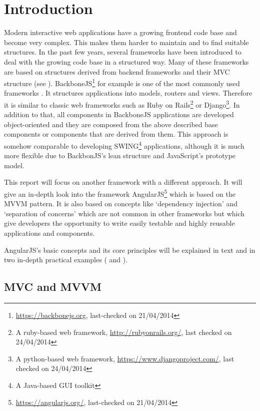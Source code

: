 \chapter{Introduction}
\label{ch:introduction}

Modern interactive web applications have a growing frontend code base and become very complex. This makes them harder to maintain and to find suitable structures. In the past few years, several frameworks have been introduced to deal with the growing code base in a structured way. Many of these frameworks are based on structures derived from backend frameworks and their MVC structure (see ). BackboneJS\footnote{\url{https://backbonejs.org}, last-checked on 21/04/2014} for example is one of the most commonly used frameworks \cite{sanderson2012rich}. It structures applications into models, routers and views. Therefore it is similar to classic web frameworks such as Ruby on Rails\footnote{A ruby-based web framework, \url{http://rubyonrails.org/}, last checked on 24/04/2014} or Django\footnote{A python-based web framework, \url{https://www.djangoproject.com/}, last checked on 24/04/2014}. In addition to that, all components in BackboneJS applications are developed object-oriented and they are composed from the above described base components or components that are derived from them. This approach is somehow comparable to developing SWING\footnote{A Java-based GUI toolkit} applications, although it is much more flexible due to BackbonJS's lean structure and JavaScript's prototype model.

This report will focus on another framework with a different approach. It will give an in-depth look into the framework AngularJS\footnote{\url{https://angularjs.org/}, last-checked on 21/04/2014} which is based on the MVVM pattern. It is also based on concepts like `dependency injection' and `separation of concerns' which are not common in other frameworks but which give developers the opportunity to write easily testable and highly reusable applications and components.

AngularJS's basic concepts and its core principles will be explained in text and in two in-depth practical examples ( and ). 

\section{MVC and MVVM}
\label{sec:mvcmvvm}


